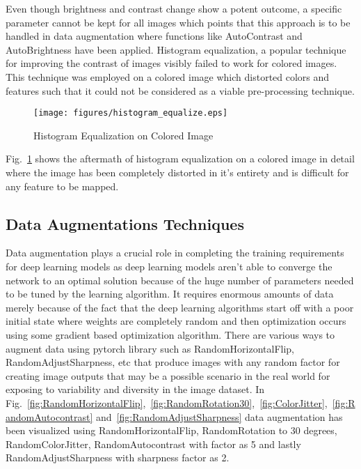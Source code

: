 \documentclass[conference]{IEEEtran}
\begin{document}
Even though brightness and contrast change show a potent outcome, a specific parameter cannot be kept for all images which points that this approach is to be handled in data augmentation where functions like AutoContrast and AutoBrightness have been applied. Histogram equalization, a popular technique for improving the contrast of images visibly failed to work for colored images. This technique was employed on a colored image which distorted colors and features such that it could not be considered as a viable pre-processing technique.

\begin{figure}[htbp] 
    \texttt{[image: figures/histogram\_equalize.eps]} 
    \caption{Histogram Equalization on Colored Image} 
    \label{fig:histogram_equalize}
    \end{figure}

Fig.~\ref{fig:histogram_equalize} shows the aftermath of histogram equalization on a colored image in detail where the image has been completely distorted in it's entirety and is difficult for any feature to be mapped.

\subsection{Data Augmentations Techniques}
Data augmentation plays a crucial role in completing the training requirements for deep learning models as deep learning models aren’t able to converge the network to an optimal solution because of the huge number of parameters needed to be tuned by the learning algorithm. It requires enormous amounts of data merely because of the fact that the deep learning algorithms start off with a poor initial state where weights are completely random and then optimization occurs using some gradient based optimization algorithm.  There are various ways to augment data using pytorch library such as RandomHorizontalFlip, RandomAdjustSharpness, etc that produce images with any random factor for creating image outputs that may be a possible scenario in the real world for exposing to variability and diversity in the image dataset. In Fig.~\ref{fig:RandomHorizontalFlip},~\ref{fig:RandomRotation30},~\ref{fig:ColorJitter},~\ref{fig:RandomAutocontrast} and~\ref{fig:RandomAdjustSharpness} data augmentation has been visualized using RandomHorizontalFlip, RandomRotation to 30 degrees, RandomColorJitter, RandomAutocontrast with factor as 5 and lastly RandomAdjustSharpness with sharpness factor as 2.
\end{document}
